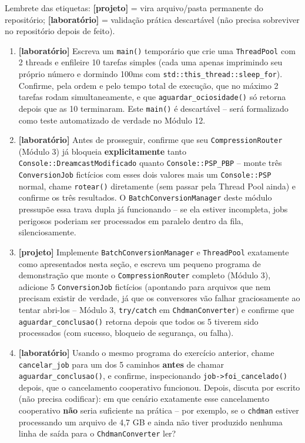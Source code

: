 \begin{CaixaDesafio}
Lembrete das etiquetas: \textbf{[projeto]} = vira arquivo/pasta permanente do repositório; \textbf{[laboratório]} = validação prática descartável (não precisa sobreviver no repositório depois de feito).

\begin{enumerate}[label=\textbf{4.\arabic*}]
    \item \textbf{[laboratório]} Escreva um \texttt{main()} temporário que crie uma \texttt{ThreadPool} com 2 threads e enfileire 10 tarefas simples (cada uma apenas imprimindo seu próprio número e dormindo 100ms com \texttt{std::this\_thread::sleep\_for}). Confirme, pela ordem e pelo tempo total de execução, que no máximo 2 tarefas rodam simultaneamente, e que \texttt{aguardar\_ociosidade()} só retorna depois que as 10 terminaram. Este \texttt{main()} é descartável -- será formalizado como teste automatizado de verdade no Módulo 12.
    \item \textbf{[laboratório]} Antes de prosseguir, confirme que seu \texttt{CompressionRouter} (Módulo 3) já bloqueia \textbf{explicitamente} tanto \texttt{Console::DreamcastModificado} quanto \texttt{Console::PSP\_PBP} -- monte três \texttt{ConversionJob} fictícios com esses dois valores mais um \texttt{Console::PSP} normal, chame \texttt{rotear()} diretamente (sem passar pela Thread Pool ainda) e confirme os três resultados. O \texttt{BatchConversionManager} deste módulo pressupõe essa trava dupla já funcionando -- se ela estiver incompleta, jobs perigosos poderiam ser processados em paralelo dentro da fila, silenciosamente.
    \item \textbf{[projeto]} Implemente \texttt{BatchConversionManager} e \texttt{ThreadPool} exatamente como apresentados nesta seção, e escreva um pequeno programa de demonstração que monte o \texttt{CompressionRouter} completo (Módulo 3), adicione 5 \texttt{ConversionJob} fictícios (apontando para arquivos que nem precisam existir de verdade, já que os conversores vão falhar graciosamente ao tentar abri-los -- Módulo 3, \texttt{try/catch} em \texttt{ChdmanConverter}) e confirme que \texttt{aguardar\_conclusao()} retorna depois que todos os 5 tiverem sido processados (com sucesso, bloqueio de segurança, ou falha).
    \item \textbf{[laboratório]} Usando o mesmo programa do exercício anterior, chame \texttt{cancelar\_job} para um dos 5 caminhos \textbf{antes} de chamar \texttt{aguardar\_conclusao()}, e confirme, inspecionando \texttt{job->foi\_cancelado()} depois, que o cancelamento cooperativo funcionou. Depois, discuta por escrito (não precisa codificar): em que cenário exatamente esse cancelamento cooperativo \textbf{não} seria suficiente na prática -- por exemplo, se o \texttt{chdman} estiver processando um arquivo de 4,7 GB e ainda não tiver produzido nenhuma linha de saída para o \texttt{ChdmanConverter} ler?

\end{enumerate}
\end{CaixaDesafio}
